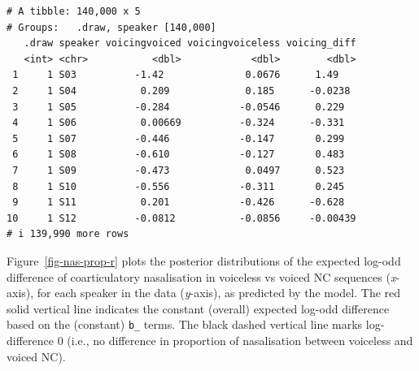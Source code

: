 \documentclass[
  authoryear,
  preprint,
  3p]{elsarticle}
\newenvironment{Shaded}{\begin{snugshade}}{\end{snugshade}}
\newcommand{\AttributeTok}[1]{\textcolor[rgb]{0.40,0.45,0.13}{#1}}
\newcommand{\DecValTok}[1]{\textcolor[rgb]{0.68,0.00,0.00}{#1}}
\newcommand{\FloatTok}[1]{\textcolor[rgb]{0.68,0.00,0.00}{#1}}
\newcommand{\FunctionTok}[1]{\textcolor[rgb]{0.28,0.35,0.67}{#1}}
\newcommand{\NormalTok}[1]{\textcolor[rgb]{0.00,0.23,0.31}{#1}}
\newcommand{\SpecialCharTok}[1]{\textcolor[rgb]{0.37,0.37,0.37}{#1}}
\newcommand{\StringTok}[1]{\textcolor[rgb]{0.13,0.47,0.30}{#1}}
\begin{document}
\begin{verbatim}
# A tibble: 140,000 x 5
# Groups:   .draw, speaker [140,000]
   .draw speaker voicingvoiced voicingvoiceless voicing_diff
   <int> <chr>           <dbl>            <dbl>        <dbl>
 1     1 S03          -1.42              0.0676      1.49   
 2     1 S04           0.209             0.185      -0.0238 
 3     1 S05          -0.284            -0.0546      0.229  
 4     1 S06           0.00669          -0.324      -0.331  
 5     1 S07          -0.446            -0.147       0.299  
 6     1 S08          -0.610            -0.127       0.483  
 7     1 S09          -0.473             0.0497      0.523  
 8     1 S10          -0.556            -0.311       0.245  
 9     1 S11           0.201            -0.426      -0.628  
10     1 S12          -0.0812           -0.0856     -0.00439
# i 139,990 more rows
\end{verbatim}

Figure~\ref{fig-nas-prop-r} plots the posterior distributions of the
expected log-odd difference of coarticulatory nasalisation in voiceless
vs voiced NC sequences (\emph{x}-axis), for each speaker in the data
(\emph{y}-axis), as predicted by the model. The red solid vertical line
indicates the constant (overall) expected log-odd difference based on
the (constant) \texttt{b\_} terms. The black dashed vertical line marks
log-difference 0 (i.e., no difference in proportion of nasalisation
between voiceless and voiced NC).

\begin{Shaded}
\end{Shaded}
\end{document}

